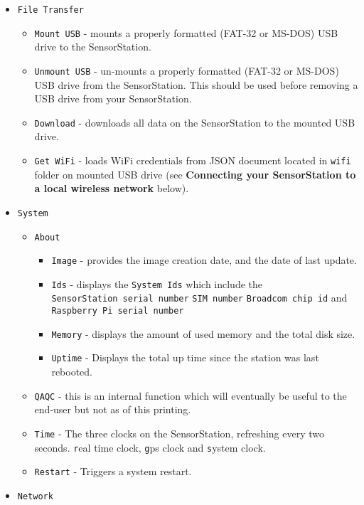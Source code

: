 \documentclass[
]{article}
\providecommand{\tightlist}{%
  \setlength{\itemsep}{0pt}\setlength{\parskip}{0pt}}
\begin{document}
\begin{itemize}
\tightlist
\item
  \texttt{File\ Transfer}

  \begin{itemize}
  \tightlist
  \item
    \texttt{Mount\ USB} - mounts a properly formatted (FAT-32 or MS-DOS)
    USB drive to the SensorStation.
  \item
    \texttt{Unmount\ USB} - un-mounts a properly formatted (FAT-32 or
    MS-DOS) USB drive from the SensorStation. This should be used before
    removing a USB drive from your SensorStation.
  \item
    \texttt{Download} - downloads all data on the SensorStation to the
    mounted USB drive.
  \item
    \texttt{Get\ WiFi} - loads WiFi credentials from JSON document
    located in \texttt{wifi} folder on mounted USB drive (see
    \textbf{Connecting your SensorStation to a local wireless network}
    below).
  \end{itemize}
\item
  \texttt{System}

  \begin{itemize}
  \tightlist
  \item
    \texttt{About}

    \begin{itemize}
    \tightlist
    \item
      \texttt{Image} - provides the image creation date, and the date of
      last update.
    \item
      \texttt{Ids} - displays the \texttt{System\ Ids} which include the
      \texttt{SensorStation\ serial\ number} \texttt{SIM\ number}
      \texttt{Broadcom\ chip\ id} and
      \texttt{Raspberry\ Pi\ serial\ number}
    \item
      \texttt{Memory} - displays the amount of used memory and the total
      disk size.
    \item
      \texttt{Uptime} - Displays the total up time since the station was
      last rebooted.
    \end{itemize}
  \item
    \texttt{QAQC} - this is an internal function which will eventually
    be useful to the end-user but not as of this printing.
  \item
    \texttt{Time} - The three clocks on the SensorStation, refreshing
    every two seconds. \texttt{r}eal time clock, \texttt{g}ps clock and
    \texttt{s}ystem clock.
  \item
    \texttt{Restart} - Triggers a system restart.
  \end{itemize}
\item
  \texttt{Network}


\end{itemize}
\end{document}
